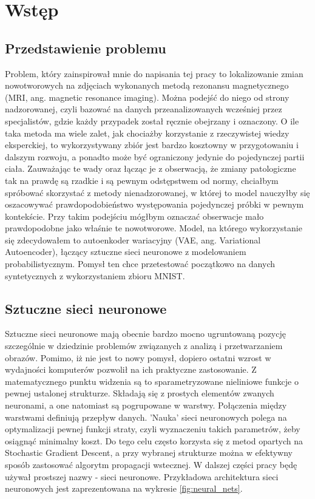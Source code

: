 \chapter{Wstęp}

\section{Przedstawienie problemu}

Problem, który zainspirował mnie do napisania tej pracy to lokalizowanie zmian nowotworowych na zdjęciach wykonanych metodą rezonansu magnetycznego (MRI, ang. magnetic resonance imaging). Można podejść do niego od strony nadzorowanej, czyli bazować na danych przeanalizowanych wcześniej przez specjalistów, gdzie każdy przypadek został ręcznie obejrzany i oznaczony. O ile taka metoda ma wiele zalet, jak chociażby korzystanie z rzeczywistej wiedzy eksperckiej, to wykorzystywany zbiór jest bardzo kosztowny w przygotowaniu i dalszym rozwoju, a ponadto może być ograniczony jedynie do pojedynczej partii ciała. Zauważając te wady oraz łącząc je z obserwacją, że zmiany patologiczne tak na prawdę są rzadkie i są pewnym odstępstwem od normy, chciałbym spróbować skorzystać z metody nienadzorowanej, w której to model nauczyłby się oszacowywać prawdopodobieństwo występowania pojedynczej próbki w pewnym kontekście. Przy takim podejściu mógłbym oznaczać obserwacje mało prawdopodobne jako właśnie te nowotworowe. Model, na którego wykorzystanie się zdecydowałem to autoenkoder wariacyjny (VAE, ang. Variational Autoencoder), łączący sztuczne sieci neuronowe z modelowaniem probabilistycznym. Pomysł ten chce przetestować początkowo na danych syntetycznych z wykorzystaniem zbioru MNIST.

\section{Sztuczne sieci neuronowe}

Sztuczne sieci neuronowe mają obecnie bardzo mocno ugruntowaną pozycję szczególnie w dziedzinie problemów związanych z analizą i przetwarzaniem obrazów. Pomimo, iż nie jest to nowy pomysł, dopiero ostatni wzrost w wydajności komputerów pozwolił na ich praktyczne zastosowanie. Z matematycznego punktu widzenia są to sparametryzowane nieliniowe funkcje o pewnej ustalonej strukturze. Składają się z prostych elementów zwanych neuronami, a one natomiast są pogrupowane w warstwy. Połączenia między warstwami definiują przepływ danych. 'Nauka' sieci neuronowych polega na optymalizacji pewnej funkcji straty, czyli wyznaczeniu takich parametrów, żeby osiągnąć minimalny koszt. Do tego celu często korzysta się z metod opartych na Stochastic Gradient Descent, a przy wybranej strukturze można w efektywny sposób zastosować algorytm propagacji wstecznej. W dalszej części pracy będę używał prostszej nazwy - sieci neuronowe. Przykładowa architektura sieci neuronowych jest zaprezentowana na wykresie \ref{fig:neural_nets}.

